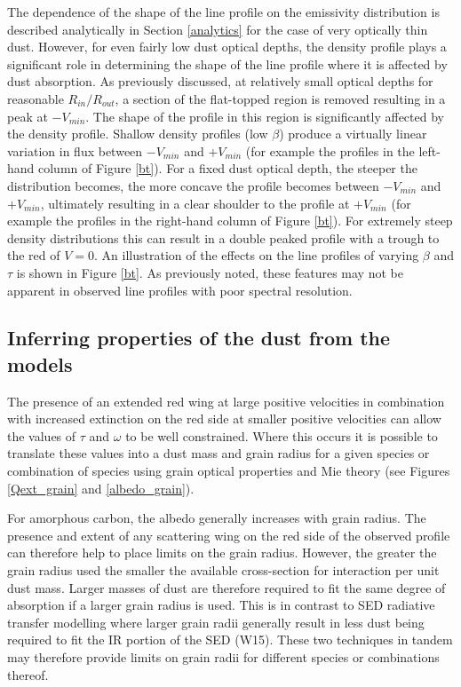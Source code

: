 The dependence of the shape of the line profile on the emissivity 
distribution is described analytically in Section \ref{analytics} for the 
case of very optically thin dust.  However, for even fairly low dust 
optical depths, the density profile plays a significant role in 
determining the shape of the line profile where it is affected by dust 
absorption.  As previously discussed, at relatively small optical depths 
for reasonable $R_{in}/R_{out}$, a section of the flat-topped region is 
removed resulting in a peak at $-V_{min}$.  The shape of the profile in 
this region is significantly affected by the density profile.  Shallow 
density profiles (low $\beta$) produce a virtually linear variation in 
flux between $-V_{min}$ and $+V_{min}$ (for example the profiles in the 
left-hand column of Figure \ref{bt}).  For a fixed dust optical depth, the 
steeper the distribution becomes, the more concave the profile becomes 
between $-V_{min}$ and $+V_{min}$, ultimately resulting in a clear 
shoulder to the profile at $+V_{min}$ (for example the profiles in the 
right-hand column of Figure \ref{bt}).  For extremely steep density 
distributions this can result in a double peaked profile with a trough to 
the red of $V=0$.  An illustration of the effects on the line profiles of 
varying $\beta$ and $\tau$ is shown in Figure \ref{bt}.  As previously 
noted, these features may not be apparent in observed line profiles with 
poor spectral resolution.

\subsection{Inferring properties of the dust from the models}

The presence of an extended red wing at large positive velocities in 
combination with increased extinction on the red side at smaller positive 
velocities can allow the values of $\tau$ and $\omega$ to be well 
constrained.  Where this occurs it is possible to translate these values into a 
dust mass and grain radius for a given species or combination of 
species using grain optical properties and Mie theory (see Figures \ref{Qext_grain} and \ref{albedo_grain}).  


For amorphous carbon, the albedo generally increases with grain radius.  
The presence and extent of any scattering wing on the red side of the 
observed profile can therefore help to place limits on the grain radius.  
However, the greater the grain radius used the smaller the available 
cross-section for interaction per unit dust mass.  Larger masses of dust 
are therefore required to fit the same degree of absorption if a larger 
grain radius is used.  This is in contrast to SED radiative transfer 
modelling where larger grain radii generally result in less dust being 
required to fit the IR portion of the SED (W15).  These two techniques in 
tandem may therefore provide limits on grain radii for different species 
or combinations thereof.

